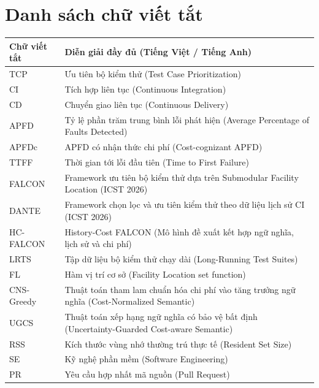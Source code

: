 \medskip

\section*{\textbf{\Large{Danh sách chữ viết tắt}}}
\medskip

\begin{center}
\renewcommand{\arraystretch}{1.2}
\begin{tabular}{|l|p{11.5cm}|}
\hline
\textbf{Chữ viết tắt} & \textbf{Diễn giải đầy đủ (Tiếng Việt / Tiếng Anh)} \\ 
\hline
TCP & Ưu tiên bộ kiểm thử (Test Case Prioritization) \\ 
\hline
CI & Tích hợp liên tục (Continuous Integration) \\ 
\hline
CD & Chuyển giao liên tục (Continuous Delivery) \\ 
\hline
APFD & Tỷ lệ phần trăm trung bình lỗi phát hiện (Average Percentage of Faults Detected) \\ 
\hline
APFDc & APFD có nhận thức chi phí (Cost-cognizant APFD) \\ 
\hline
TTFF & Thời gian tới lỗi đầu tiên (Time to First Failure) \\ 
\hline
FALCON & Framework ưu tiên bộ kiểm thử dựa trên Submodular Facility Location (ICST 2026) \\ 
\hline
DANTE & Framework chọn lọc và ưu tiên kiểm thử theo dữ liệu lịch sử CI (ICST 2026) \\
\hline
HC-FALCON & History-Cost FALCON (Mô hình đề xuất kết hợp ngữ nghĩa, lịch sử và chi phí) \\ 
\hline
LRTS & Tập dữ liệu bộ kiểm thử chạy dài (Long-Running Test Suites) \\ 
\hline
FL & Hàm vị trí cơ sở (Facility Location set function) \\ 
\hline
CNS-Greedy & Thuật toán tham lam chuẩn hóa chi phí vào tăng trưởng ngữ nghĩa (Cost-Normalized Semantic) \\ 
\hline
UGCS & Thuật toán xếp hạng ngữ nghĩa có bảo vệ bất định (Uncertainty-Guarded Cost-aware Semantic) \\ 
\hline
RSS & Kích thước vùng nhớ thường trú thực tế (Resident Set Size) \\
\hline
SE & Kỹ nghệ phần mềm (Software Engineering) \\
\hline
PR & Yêu cầu hợp nhất mã nguồn (Pull Request) \\
\hline
\end{tabular}
\end{center}
